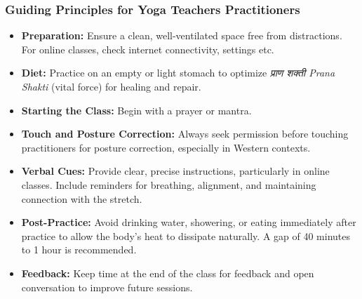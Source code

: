 \begin{frame}[fragile]\frametitle{Guiding Principles for Yoga Teachers Practitioners}

\begin{itemize}
    \item \textbf{Preparation:} Ensure a clean, well-ventilated space free from distractions. For online classes, check internet connectivity, settings etc.
    \item \textbf{Diet:} Practice on an empty or light stomach to optimize \textit{प्राण शक्ती Prana Shakti} (vital force) for healing and repair.
    \item \textbf{Starting the Class:} Begin with a prayer or mantra. 
    \item \textbf{Touch and Posture Correction:} Always seek permission before touching practitioners for posture correction, especially in Western contexts. %
    \item \textbf{Verbal Cues:} Provide clear, precise instructions, particularly in online classes. Include reminders for breathing, alignment, and maintaining connection with the stretch.
    \item \textbf{Post-Practice:} Avoid drinking water, showering, or eating immediately after practice to allow the body’s heat to dissipate naturally. A gap of 40 minutes to 1 hour is recommended.
    \item \textbf{Feedback:} Keep time at the end of the class for feedback and open conversation to improve future sessions.
\end{itemize}

\end{frame}

